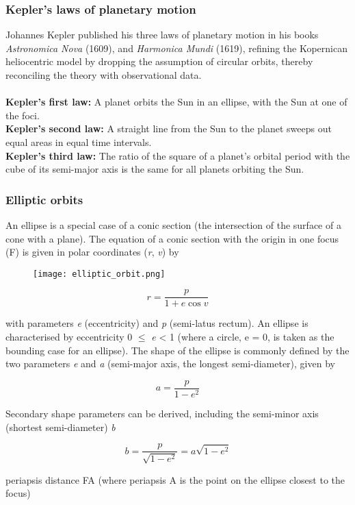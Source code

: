 \documentclass[Orbiter User Manual.tex]{subfiles}
\begin{document}
\subsubsection{Kepler's laws of planetary motion}
Johannes Kepler published his three laws of planetary motion in his books \textit{Astronomica Nova} (1609), and \textit{Harmonica Mundi} (1619), refining the Kopernican heliocentric model by dropping the assumption of circular orbits, thereby reconciling the theory with observational data.\\
\\
\textbf{Kepler's first law:} A planet orbits the Sun in an ellipse, with the Sun at one of the foci.\\
\textbf{Kepler's second law:} A straight line from the Sun to the planet sweeps out equal areas in equal time intervals.\\
\textbf{Kepler's third law:} The ratio of the square of a planet's orbital period with the cube of its semi-major axis is the same for all planets orbiting the Sun.

\subsubsection{Elliptic orbits}
An ellipse is a special case of a conic section (the intersection of the surface of a cone with a plane). The equation of a conic section with the origin in one focus (F) is given in polar coordinates (\textit{r}, \textit{v}) by

\begin{figure}[H]
	\centering
	\texttt{[image: elliptic\_orbit.png]}
\end{figure}

\[ r = \frac{p}{1 + e \cos v} \]

\noindent
with parameters \textit{e} (eccentricity) and \textit{p} (semi-latus rectum). An ellipse is characterised by eccentricity 0 $\leq$ \textit{e} < 1 (where a circle, e = 0, is taken as the bounding case for an ellipse). The shape of the ellipse is commonly defined by the two parameters \textit{e} and \textit{a} (semi-major axis, the longest semi-diameter), given by

\[ a = \frac{p}{1 - e^{2}} \]

\noindent
Secondary shape parameters can be derived, including the semi-minor axis (shortest semi-diameter) \textit{b}

\[ b = \frac{p}{\sqrt{1 - e^{2}}} = a \sqrt{1 - e^{2}} \]

\noindent
periapsis distance FA (where periapsis A is the point on the ellipse closest to the focus)
\end{document}
